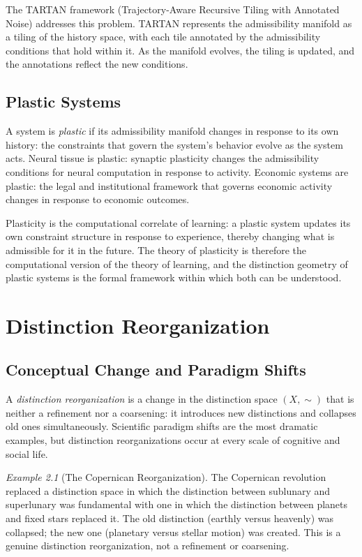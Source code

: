 \documentclass[12pt,a4paper]{book}
\theoremstyle{remark}
\newtheorem{example}{Example}[chapter]
\theoremstyle{definition}
\begin{document}
The TARTAN framework (Trajectory-Aware Recursive Tiling with Annotated
Noise) addresses this problem. TARTAN represents the admissibility manifold
as a tiling of the history space, with each tile annotated by the
admissibility conditions that hold within it. As the manifold evolves,
the tiling is updated, and the annotations reflect the new conditions.

\section{Plastic Systems}

A system is \emph{plastic} if its admissibility manifold changes in
response to its own history: the constraints that govern the system's
behavior evolve as the system acts. Neural tissue is plastic: synaptic
plasticity changes the admissibility conditions for neural computation
in response to activity. Economic systems are plastic: the legal and
institutional framework that governs economic activity changes in response
to economic outcomes.

Plasticity is the computational correlate of learning: a plastic system
updates its own constraint structure in response to experience, thereby
changing what is admissible for it in the future. The theory of plasticity
is therefore the computational version of the theory of learning, and the
distinction geometry of plastic systems is the formal framework within
which both can be understood.

\chapter{Distinction Reorganization}

\section{Conceptual Change and Paradigm Shifts}

A \emph{distinction reorganization} is a change in the distinction space
$(X, \sim)$ that is neither a refinement nor a coarsening: it introduces
new distinctions and collapses old ones simultaneously. Scientific
paradigm shifts are the most dramatic examples, but distinction
reorganizations occur at every scale of cognitive and social life.

\begin{example}[The Copernican Reorganization]
The Copernican revolution replaced a distinction space in which the
distinction between sublunary and superlunary was fundamental with one
in which the distinction between planets and fixed stars replaced it.
The old distinction (earthly versus heavenly) was collapsed; the new
one (planetary versus stellar motion) was created. This is a genuine
distinction reorganization, not a refinement or coarsening.
\end{example}
\end{document}
